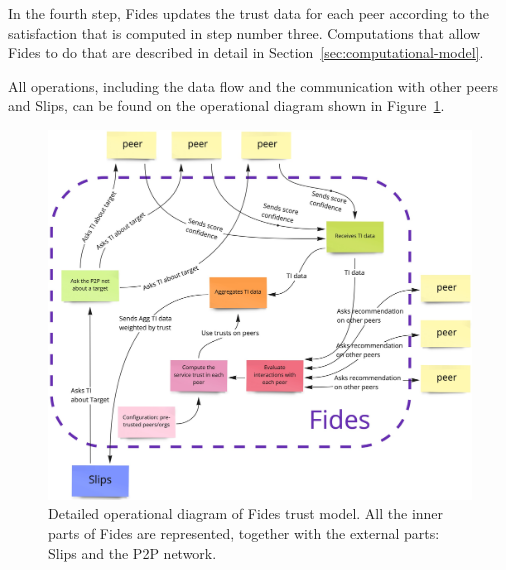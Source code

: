 In the fourth step, Fides updates the trust data for each peer according to the satisfaction that is computed in step number three.
Computations that allow Fides to do that are described in detail in Section~\ref{sec:computational-model}.

All operations, including the data flow and the communication with other peers and Slips, can be found on the operational diagram shown in Figure~\ref{fig:trust-model-operational-diagram}.

\begin{figure}[h]
    \centering
    \includegraphics[width=1.0\textwidth]{assets/fides_operational_diagram.jpeg}
    \caption{Detailed operational diagram of Fides trust model. All the inner parts of Fides are represented, together with the external parts: Slips and the P2P network.}
    \label{fig:trust-model-operational-diagram}
\end{figure}